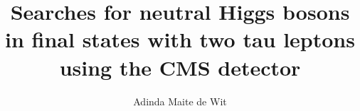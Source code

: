 \documentclass[hyperpdf,bindnopdf]{hepthesis}
\title{Searches for neutral Higgs bosons in final states with two tau leptons using the CMS detector}
\author{Adinda Maite de Wit}
\begin{document}
\begin{frontmatter}
  
\end{frontmatter}

\begin{mainmatter}
  
  
  
  
  
  
\end{mainmatter}

%  

\begin{backmatter}
  
\end{backmatter}

\end{document}
